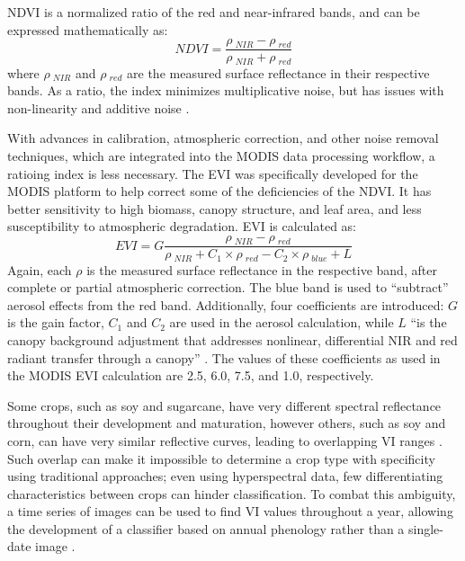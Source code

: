 NDVI is a normalized ratio of the red and near-infrared bands, and can be expressed mathematically as:
\begin{equation}
  NDVI = \frac{\rho~_{NIR} - \rho~_{red}}{\rho~_{NIR} + \rho~_{red}}
\end{equation}
where $\rho~_{NIR}$ and $\rho~_{red}$ are the measured surface reflectance in their respective bands. As a ratio, the index minimizes multiplicative noise, but has issues with non-linearity and additive noise \autocite{huete2002overview}.

With advances in calibration, atmospheric correction, and other noise removal techniques, which are integrated into the MODIS data processing workflow, a ratioing index is less necessary. The EVI was specifically developed for the MODIS platform to help correct some of the deficiencies of the NDVI. It has better sensitivity to high biomass, canopy structure, and leaf area, and less susceptibility to atmospheric degradation. EVI is calculated as:
\begin{equation}
  EVI = G\frac{\rho~_{NIR} - \rho~_{red}}{\rho~_{NIR} +  C_1\times\rho~_{red} - C_2 \times \rho~_{blue} + L}
\end{equation}
Again, each $\rho$ is the measured surface reflectance in the respective band, after complete or partial atmospheric correction. The blue band is used to ``subtract'' aerosol effects from the red band. Additionally, four coefficients are introduced: $G$ is the gain factor, $C_1$ and $C_2$ are used in the aerosol calculation, while $L$ ``is the canopy background adjustment that addresses nonlinear, differential NIR and red radiant transfer through a canopy'' \citereset\autocite[196]{huete2002overview}. The values of these coefficients as used in the MODIS EVI calculation are 2.5, 6.0, 7.5, and 1.0, respectively.

Some crops, such as soy and sugarcane, have very different spectral reflectance throughout their development and maturation, however others, such as soy and corn, can have very similar reflective curves, leading to overlapping VI ranges \autocite{price1994how-unique}. Such overlap can make it impossible to determine a crop type with specificity using traditional approaches; even using hyperspectral data, few differentiating characteristics between crops can hinder classification. To combat this ambiguity, a time series of images can be used to find VI values throughout a year, allowing the development of a classifier based on annual phenology rather than a single-date image \autocites{gu2010phenological}{wardlow2002discriminating}{wardlow2005state-level}{wardlow2007analysis}{wardlow2008large-area}{zhang2003monitoring}.
	
